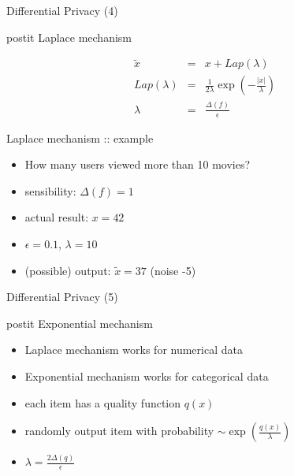 \documentclass{beamer}
\begin{document}
\begin{frame}{Differential Privacy (4)}
  \begin{beamercolorbox}[wd=\textwidth,rounded=true,shadow=true]{postit}
    Laplace mechanism
  \end{beamercolorbox}
  \pause
  \begin{eqnarray*}
    \tilde x &=& x + Lap(\lambda)\\
    Lap(\lambda) &=& \frac{1}{2\lambda}\exp(-\frac{|x|}{\lambda})\\
    \lambda &=& \frac{\Delta(f)}{\epsilon}
  \end{eqnarray*}
  \begin{center}
  \end{center}
\end{frame}

\begin{frame}{Laplace mechanism :: example}
  \begin{itemize}[<+->]
    \item How many users viewed more than 10 movies?
    \item sensibility: $\Delta(f) = 1$
    \item actual result: $x = 42$
    \item $\epsilon = 0.1$, $\lambda = 10$
    \item (possible) output: $\tilde x = 37$ (noise -5)
  \end{itemize}
\end{frame}

\begin{frame}{Differential Privacy (5)}
  \begin{beamercolorbox}[wd=\textwidth,rounded=true,shadow=true]{postit}
    Exponential mechanism
  \end{beamercolorbox}
  \pause
  \begin{itemize}
    \item Laplace mechanism works for numerical data
    \item Exponential mechanism works for categorical data
    \item each item has a quality function $q(x)$
    \item randomly output item with probability $\sim \exp(\frac{q(x)}{\lambda})$
    \item $\lambda = \frac{2\Delta(q)}{\epsilon}$
  \end{itemize}
\end{frame}
\end{document}
